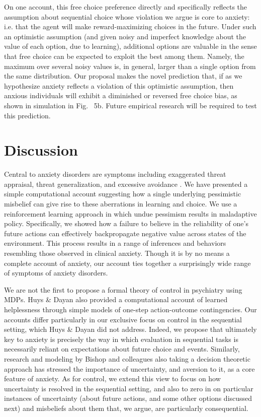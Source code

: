\documentclass[11pt]{article} %
\begin{document}
On one account\citep{ly2019}, this free choice preference directly and specifically reflects the assumption about sequential choice whose violation we argue is core to anxiety: i.e. that the agent will make reward-maximizing choices in the future. Under such an optimistic assumption (and given noisy and imperfect knowledge about the value of each option, due to learning), additional options are valuable in the sense that free choice can be expected to exploit the best among them. Namely, the maximum over several noisy values is, in general, larger than a single option from the same distribution. Our proposal makes the novel prediction that, if as we hypothesize anxiety reflects a violation of this optimistic assumption, then anxious individuals will exhibit a diminished or reversed free choice bias, as shown in simulation in Fig. ~5b. Future empirical research will be required to test this prediction.

\section{Discussion}

Central to anxiety disorders are symptoms including exaggerated threat appraisal, threat generalization, and excessive avoidance \citep{ClarkBeck2011, dymond2015, Arnaudova2017}. We have presented a simple computational account suggesting how a single underlying pessimistic misbelief can give rise to these aberrations in learning and choice. We use a reinforcement learning approach in which undue pessimism results in maladaptive policy. Specifically, we showed how a failure to believe in the reliability of one's future actions can effectively backpropagate negative value across states of the environment. This process results in a range of inferences and behaviors resembling those observed in clinical anxiety. Though it is by no means a complete account of anxiety, our account ties together a surprisingly wide range of symptoms of anxiety disorders.

We are not the first to propose a formal theory of control in psychiatry using MDPs. Huys \& Dayan \cite{HuysDayan2009} also provided a computational account of learned helplessness through simple models of one-step action-outcome contingencies. Our accounts differ particularly in our exclusive focus on control in the sequential setting, which Huys \& Dayan did not address. Indeed, we propose that ultimately key to anxiety is precisely the way in which evaluation in sequential tasks is necessarily reliant on expectations about future choice and events. Similarly, research and modeling by Bishop and colleagues \citep{browning2015, gagne2018} also taking a decision theoretic approach has stressed the importance of uncertainty, and aversion to it, as a core feature of anxiety. As for control, we extend this view to focus on how uncertainty is resolved in the sequential setting, and also to zero in on particular instances of uncertainty (about future actions, and some other options discussed next) and misbeliefs about them that, we argue, are particularly consequential.
\end{document}
